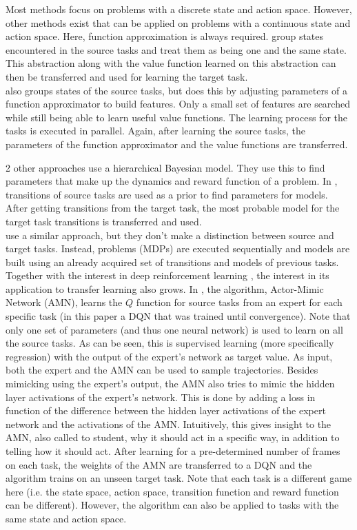 Most methods focus on problems with a discrete state and action space. However, other methods exist that can be applied on problems with a continuous state and action space. Here, function approximation is always required. \cite{walsh2006transferring} group states encountered in the source tasks and treat them as being one and the same state. This abstraction along with the value function learned on this abstraction can then be transferred and used for learning the target task.\\
\cite{lazaric2008knowledge} also groups states of the source tasks, but does this by adjusting parameters of a function approximator to build features. Only a small set of features are searched while still being able to learn useful value functions. The learning process for the tasks is executed in parallel. Again, after learning the source tasks, the parameters of the function approximator and the value functions are transferred.

2 other approaches use a hierarchical Bayesian model. They use this to find parameters that make up the dynamics and reward function of a problem. In \cite{sunmola2006model}, transitions of source tasks are used as a prior to find parameters for models. After getting transitions from the target task, the most probable model for the target task transitions is transferred and used.\\
\cite{conf/icml/WilsonFRT07} use a similar approach, but they don't make a distinction between source and target tasks. Instead, problems (MDPs) are executed sequentially and models are built using an already acquired set of transitions and models of previous tasks.\\

Together with the interest in deep reinforcement learning \citep{Mnih2015Human-levelLearning,Mnih2016AsynchronousLearning}, the interest in its application to transfer learning also grows. In \cite{DBLP:journals/corr/ParisottoBS15}, the algorithm, Actor-Mimic Network (AMN), learns the $Q$ function for source tasks from an expert for each specific task (in this paper a DQN that was trained until convergence).
Note that only one set of parameters (and thus one neural network) is used to learn on all the source tasks. As can be seen, this is supervised learning (more specifically regression) with the output of the expert's network as target value. As input, both the expert and the AMN can be used to sample trajectories.
Besides mimicking using the expert's output, the AMN also tries to mimic the hidden layer activations of the expert's network. This is done by adding a loss in function of the difference between the hidden layer activations of the expert network and the activations of the AMN. Intuitively, this gives insight to the AMN, also called to student, why it should act in a specific way, in addition to telling how it should act.
After learning for a pre-determined number of frames on each task, the weights of the AMN are transferred to a DQN and the algorithm trains on an unseen target task.
Note that each task is a different game here (i.e. the state space, action space, transition function and reward function can be different). However, the algorithm can also be applied to tasks with the same state and action space.

